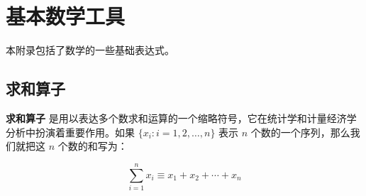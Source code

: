\nocite{*}
\printbibliography[heading=bibintoc, title=\ebibname]
\appendix

\chapter{基本数学工具}


本附录包括了数学的一些基础表达式。

\section{求和算子}

\textbf{求和算子} 是用以表达多个数求和运算的一个缩略符号，它在统计学和计量经济学分析中扮演着重要作用。如果 $\{x_i: i=1, 2, \ldots, n\}$ 表示 $n$ 个数的一个序列，那么我们就把这 $n$ 个数的和写为：

\begin{equation}
\sum_{i=1}^n x_i \equiv x_1 + x_2 +\cdots + x_n
\end{equation}